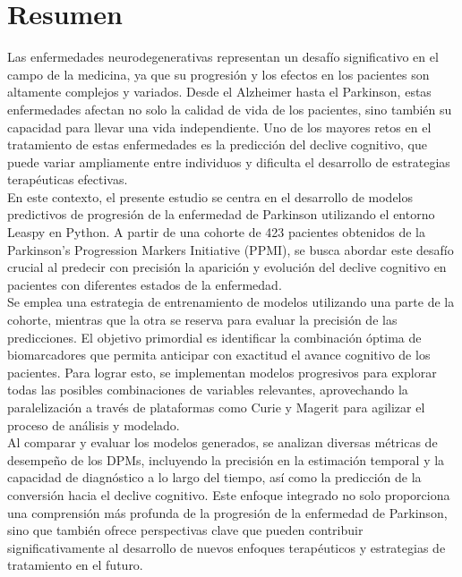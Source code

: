 \chapter{Resumen}

Las enfermedades neurodegenerativas representan un desafío significativo en el campo de la medicina, ya que su progresión y los efectos en los pacientes son altamente complejos y variados. Desde el Alzheimer hasta el Parkinson, estas enfermedades afectan no solo la calidad de vida de los pacientes, sino también su capacidad para llevar una vida independiente. Uno de los mayores retos en el tratamiento de estas enfermedades es la predicción del declive cognitivo, que puede variar ampliamente entre individuos y dificulta el desarrollo de estrategias terapéuticas efectivas.\\

En este contexto, el presente estudio se centra en el desarrollo de modelos predictivos de progresión de la enfermedad de Parkinson utilizando el entorno Leaspy en Python. A partir de una cohorte de 423 pacientes obtenidos de la Parkinson's Progression Markers Initiative (PPMI), se busca abordar este desafío crucial al predecir con precisión la aparición y evolución del declive cognitivo en pacientes con diferentes estados de la enfermedad.\\

Se emplea una estrategia de entrenamiento de modelos utilizando una parte de la cohorte, mientras que la otra se reserva para evaluar la precisión de las predicciones. El objetivo primordial es identificar la combinación óptima de biomarcadores que permita anticipar con exactitud el avance cognitivo de los pacientes. Para lograr esto, se implementan modelos progresivos para explorar todas las posibles combinaciones de variables relevantes, aprovechando la paralelización a través de plataformas como Curie y Magerit para agilizar el proceso de análisis y modelado.\\

Al comparar y evaluar los modelos generados, se analizan diversas métricas de desempeño de los DPMs, incluyendo la precisión en la estimación temporal y la capacidad de diagnóstico a lo largo del tiempo, así como la predicción de la conversión hacia el declive cognitivo. Este enfoque integrado no solo proporciona una comprensión más profunda de la progresión de la enfermedad de Parkinson, sino que también ofrece perspectivas clave que pueden contribuir significativamente al desarrollo de nuevos enfoques terapéuticos y estrategias de tratamiento en el futuro.

